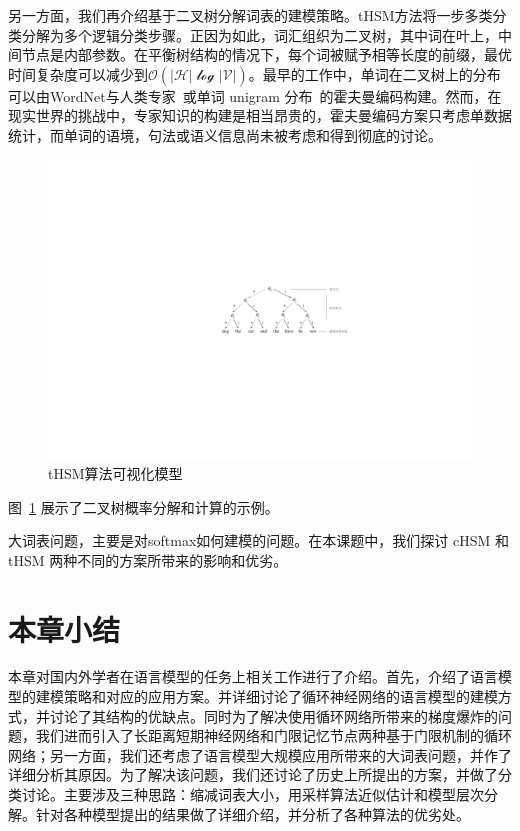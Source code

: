 另一方面，我们再介绍基于二叉树分解词表的建模策略。tHSM方法将一步多类分类分解为多个逻辑分类步骤。正因为如此，词汇组织为二叉树，其中词在叶上，中间节点是内部参数。在平衡树结构的情况下，每个词被赋予相等长度的前缀，最优时间复杂度可以减少到$\mathcal{O(|H|\log \mathcal{|V|})}$。最早的工作中，单词在二叉树上的分布可以由WordNet与人类专家~或单词 unigram 分布~的霍夫曼编码构建。然而，在现实世界的挑战中，专家知识的构建是相当昂贵的，霍夫曼编码方案只考虑单数据统计，而单词的语境，句法或语义信息尚未被考虑和得到彻底的讨论。
\begin{figure}[!h]
  \centering
\includegraphics[width=0.9\linewidth]{./figures/thsm-example.pdf}
\caption{tHSM算法可视化模型}\label{fig:case_thsm}
\end{figure}
图~\ref{fig:case_thsm} 展示了二叉树概率分解和计算的示例。

大词表问题，主要是对softmax如何建模的问题。在本课题中，我们探讨 cHSM 和 tHSM 两种不同的方案所带来的影响和优劣。
\section{本章小结}
本章对国内外学者在语言模型的任务上相关工作进行了介绍。首先，介绍了语言模型的建模策略和对应的应用方案。并详细讨论了循环神经网络的语言模型的建模方式，并讨论了其结构的优缺点。同时为了解决使用循环网络所带来的梯度爆炸的问题，我们进而引入了长距离短期神经网络和门限记忆节点两种基于门限机制的循环网络；另一方面，我们还考虑了语言模型大规模应用所带来的大词表问题，并作了详细分析其原因。为了解决该问题，我们还讨论了历史上所提出的方案，并做了分类讨论。主要涉及三种思路：缩减词表大小，用采样算法近似估计和模型层次分解。针对各种模型提出的结果做了详细介绍，并分析了各种算法的优劣处。